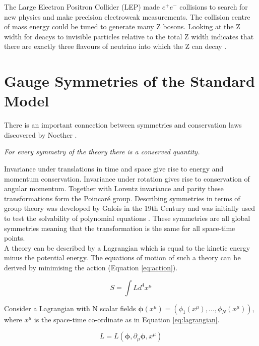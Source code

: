 The Large Electron Positron Collider (LEP) \cite{lep} made $e^{+}e^{-}$ 
collisions to search for new physics and make precision electroweak 
measurements. The collision centre of mass energy could be tuned to generate
many Z bosons. Looking at the Z width for deacys to invisible particles relative 
to the total Z width indicates that there are exactly three flavours of neutrino 
into which the Z can decay \cite{3nu}. 

\section{Gauge Symmetries of the Standard Model}

There is an important connection between symmetries and conservation laws
discovered by Noether \cite{noether}.

\begin{center}
{\it For every symmetry of the theory there is a conserved quantity.} \\
\end{center}

Invariance under translations in time and space give rise to energy and momentum
conservation. Invariance under rotation gives rise to conservation of angular
momentum. Together with Lorentz invariance and parity these transformations form 
the Poincar\'{e} group. Describing symmetries in terms of group theory was 
developed by Galois in the 19th Century and was initially used to test the 
solvability of polynomial equations \cite{galois}. These symmetries are all 
global symmetries meaning that the transformation is the same for all space-time 
points. \\

A theory can be described by a Lagrangian which is equal to the kinetic energy
minus the potential energy. The equations of motion of such a theory can be
derived by minimising the action (Equation \ref{eq:action}).

\begin{equation}
S = \int L d^{4}x^{\mu}
\label{eq:action}
\end{equation}

Consider a Lagrangian with N scalar fields $\boldsymbol\phi(x^{\mu}) =
\left(\phi_{1}(x^{\mu}),...,\phi_{N}(x^{\mu})\right)$, where $x^{\mu}$ is the
space-time co-ordinate as in Equation \ref{eq:lagrangian}.

\begin{equation}
L = L(\boldsymbol\phi, \partial_{\mu}\boldsymbol\phi, x^{\mu})
\label{eq:lagrangian}
\end{equation}

